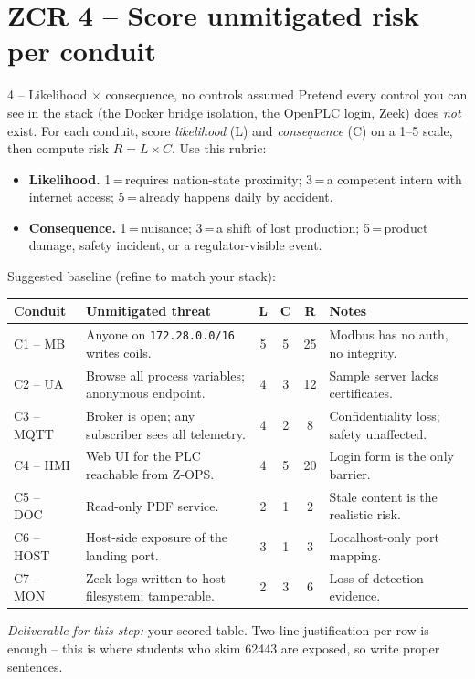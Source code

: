 \documentclass[11pt,a4paper]{article}
\begin{document}
\section*{ZCR 4 -- Score unmitigated risk per conduit}

\begin{stepbox}{4 -- Likelihood $\times$ consequence, no controls assumed}
Pretend every control you can see in the stack (the Docker bridge isolation, the OpenPLC login, Zeek) does \emph{not} exist. For each conduit, score \emph{likelihood} (L) and \emph{consequence} (C) on a 1--5 scale, then compute risk $R = L \times C$. Use this rubric:
\begin{itemize}\setlength{\itemsep}{1pt}
  \item \textbf{Likelihood.} 1\,=\,requires nation-state proximity; 3\,=\,a competent intern with internet access; 5\,=\,already happens daily by accident.
  \item \textbf{Consequence.} 1\,=\,nuisance; 3\,=\,a shift of lost production; 5\,=\,product damage, safety incident, or a regulator-visible event.
\end{itemize}
Suggested baseline (refine to match your stack):
\medskip

\noindent\small
\begin{tabular}{@{}p{} p{} c c c p{}@{}}
\toprule
\textbf{Conduit} & \textbf{Unmitigated threat} & \textbf{L} & \textbf{C} & \textbf{R} & \textbf{Notes} \\
\midrule
C1 -- MB    & Anyone on \texttt{172.28.0.0/16} writes coils.                    & 5 & 5 & 25 & Modbus has no auth, no integrity. \\
C2 -- UA    & Browse all process variables; anonymous endpoint.                 & 4 & 3 & 12 & Sample server lacks certificates. \\
C3 -- MQTT  & Broker is open; any subscriber sees all telemetry.                & 4 & 2 &  8 & Confidentiality loss; safety unaffected. \\
C4 -- HMI   & Web UI for the PLC reachable from Z-OPS.                          & 4 & 5 & 20 & Login form is the only barrier. \\
C5 -- DOC   & Read-only PDF service.                                            & 2 & 1 &  2 & Stale content is the realistic risk. \\
C6 -- HOST  & Host-side exposure of the landing port.                           & 3 & 1 &  3 & Localhost-only port mapping. \\
C7 -- MON   & Zeek logs written to host filesystem; tamperable.                 & 2 & 3 &  6 & Loss of detection evidence. \\
\bottomrule
\end{tabular}
\medskip

\emph{Deliverable for this step:} your scored table. Two-line justification per row is enough -- this is where students who skim 62443 are exposed, so write proper sentences.
\end{stepbox}
\end{document}
